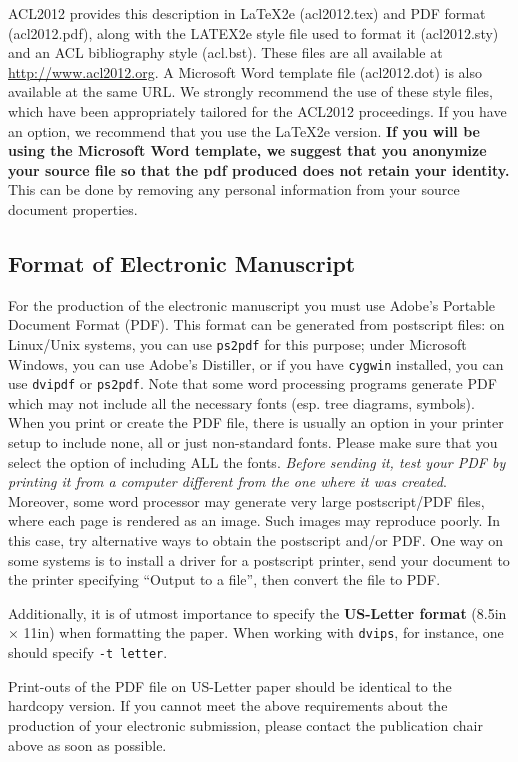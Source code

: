 \documentclass[11pt]{article}
\begin{document}
ACL2012 provides this description in \LaTeX2e (acl2012.tex) and PDF format (acl2012.pdf), along with the LATEX2e style file used to format it (acl2012.sty) and an ACL bibliography style (acl.bst). These files are all available at \url{http://www.acl2012.org}.  A Microsoft Word template file (acl2012.dot) is also available at the same URL. We strongly recommend the use of these style files, which have been appropriately tailored for the ACL2012 proceedings. If you have an option, we recommend that you use the \LaTeX2e version. \textbf{If you will be using the Microsoft Word template, we suggest that you anonymize your source file so that the pdf produced does not retain your identity.} This can be done by removing any personal information from your source
document properties.


\subsection{Format of Electronic Manuscript}
\label{sect:pdf}

For the production of the electronic manuscript you must use Adobe's
Portable Document Format (PDF). This format can be generated from
postscript files: on Linux/Unix systems, you can use {\tt ps2pdf} for this
purpose; under Microsoft Windows, you can use Adobe's Distiller, or
if you have {\tt cygwin} installed, you can use {\tt dvipdf} or
{\tt ps2pdf}.  Note
that some word processing programs generate PDF which may not include
all the necessary fonts (esp. tree diagrams, symbols). When you print
or create the PDF file, there is usually an option in your printer
setup to include none, all or just non-standard fonts.  Please make
sure that you select the option of including ALL the fonts.  {\em Before sending it, test your PDF by printing it from a computer different from the one where it was created}. Moreover,
some word processor may generate very large postscript/PDF files,
where each page is rendered as an image. Such images may reproduce
poorly.  In this case, try alternative ways to obtain the postscript
and/or PDF.  One way on some systems is to install a driver for a
postscript printer, send your document to the printer specifying
``Output to a file'', then convert the file to PDF.

Additionally, it is of utmost importance to specify the {\bf US-Letter format} (8.5in $\times$ 11in) when formatting the paper. When working with {\tt dvips}, for instance, one should specify {\tt -t letter}.

Print-outs of the PDF file on US-Letter paper should be identical to the
hardcopy version.  If you cannot meet the above requirements about the
production of your electronic submission, please contact the
publication chair above as soon as possible.
\end{document}
